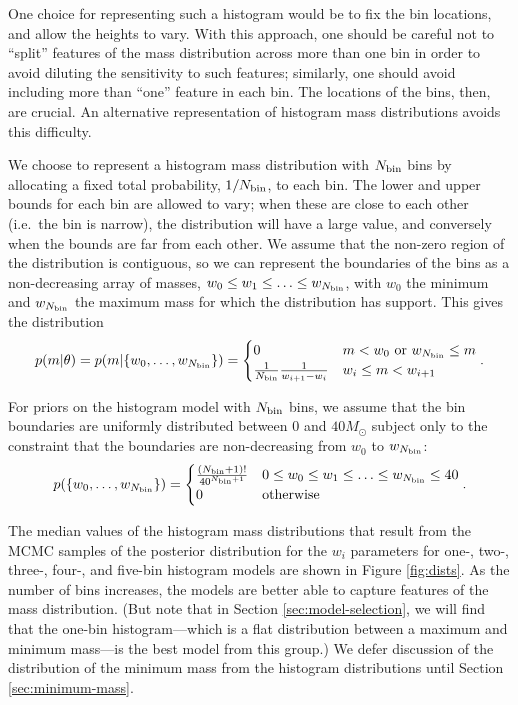 \documentclass[preprint]{aastex}
\newcommand{\Msun}{M_\odot}
\newcommand{\Nbin}{N_{\textnormal{bin}}}
\begin{document}
One choice for representing such a histogram would be to fix the bin
locations, and allow the heights to vary.  With this approach, one
should be careful not to ``split'' features of the mass distribution
across more than one bin in order to avoid diluting the sensitivity to
such features; similarly, one should avoid including more than ``one''
feature in each bin.  The locations of the bins, then, are crucial.
An alternative representation of histogram mass distributions avoids
this difficulty.

We choose to represent a histogram mass distribution with $\Nbin$ bins
by allocating a fixed total probability, $1/\Nbin$, to each bin.  The
lower and upper bounds for each bin are allowed to vary; when these
are close to each other (i.e.\ the bin is narrow), the distribution
will have a large value, and conversely when the bounds are far from
each other.  We assume that the non-zero region of the distribution is
contiguous, so we can represent the boundaries of the bins as a
non-decreasing array of masses, $w_0 \leq w_1 \leq \ldots \leq
w_{\Nbin}$, with $w_0$ the minimum and $w_{\Nbin}$ the maximum mass for
which the distribution has support.  This gives the distribution
\begin{equation}
  \label{eq:hist-def}
  p(m|\theta) = p(m|\{w_0, \ldots, w_{\Nbin}\}) = 
  \begin{cases}
    0 & m < w_0 \textnormal{ or } w_{\Nbin} \leq m \\
    \frac{1}{\Nbin} \frac{1}{w_{i+1} - w_i} & w_i \leq m < w_{i+1}
  \end{cases}.
\end{equation}

For priors on the histogram model with $\Nbin$ bins, we assume that
the bin boundaries are uniformly distributed between 0 and $40 \Msun$
subject only to the constraint that the boundaries are non-decreasing
from $w_0$ to $w_{\Nbin}$:
\begin{equation}
  p(\{w_0, \ldots, w_{\Nbin}\}) = 
  \begin{cases}
    \frac{\left(\Nbin+1\right)!}{40^{\Nbin+1}} & 0 \leq w_0 \leq w_1
    \leq \ldots \leq w_{\Nbin} \leq 40 \\
    0 & \textnormal{otherwise}
  \end{cases}.
\end{equation}

The median values of the histogram mass distributions that result from
the MCMC samples of the posterior distribution for the $w_i$
parameters for one-, two-, three-, four-, and five-bin histogram
models are shown in Figure \ref{fig:dists}.  As the number of bins
increases, the models are better able to capture features of the mass
distribution.  (But note that in Section \ref{sec:model-selection}, we
will find that the one-bin histogram---which is a flat distribution
between a maximum and minimum mass---is the best model from this
group.)  We defer discussion of the distribution of the minimum mass
from the histogram distributions until Section \ref{sec:minimum-mass}.
\end{document}
